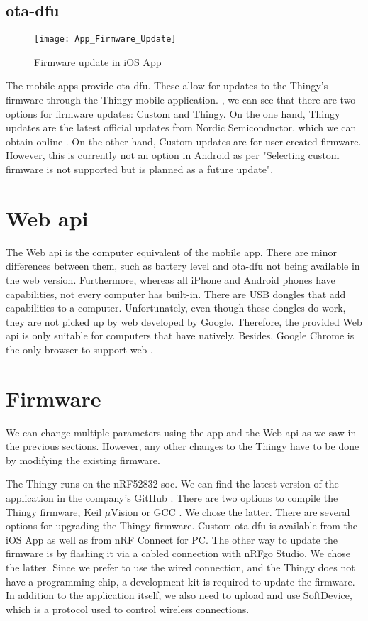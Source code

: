 \subsection{\gls{ota-dfu}}
\begin{figure}[hbt!]
	\centering
	\texttt{[image: App\_Firmware\_Update]}
	\caption{Firmware update in iOS App}
	\label{fig:app_firmware}
\end{figure}
The mobile apps provide \gls{ota-dfu}. These allow for updates to the Thingy's firmware through the Thingy mobile application. , we can see that there are two options for firmware updates: Custom and Thingy. On the one hand, Thingy updates are the latest official updates from Nordic Semiconductor, which we can obtain online \cite{FirmwareDownload}. On the other hand, Custom updates are for user-created firmware. However, this is currently not an option in Android as per \cite{DocFeatures} "Selecting custom firmware is not supported but is planned as a future update".

\section{Web \bt \gls{api}}
The Web \bt \gls{api} \cite{WebAPI} is the computer equivalent of the mobile app. There are minor differences between them, such as battery level and \gls{ota-dfu} not being available in the web version. Furthermore, whereas all iPhone and Android phones have \bt capabilities, not every computer has \bt built-in. There are USB dongles that add \bt capabilities to a computer. Unfortunately, even though these dongles do work, they are not picked up by web \bt developed by Google. Therefore, the provided Web \bt \gls{api} is only suitable for computers that have \bt natively. Besides, Google Chrome is the only browser to support web \bt \cite{WebBluetooth}.

\section{Firmware}
We can change multiple parameters using the app and the Web \bt \gls{api} as we saw in the previous sections. However, any other changes to the Thingy have to be done by modifying the existing firmware.

The Thingy runs on the nRF52832 \gls{soc}. We can find the latest version of the application in the company's GitHub \cite{FirmwareGH}. There are two options to compile the Thingy firmware, Keil $\mu${Vision} or GCC \cite{compilefirmware}. We chose the latter. There are several options for upgrading the Thingy firmware. Custom \gls{ota-dfu} is available from the iOS App as well as from nRF Connect for PC. The other way to update the firmware is by flashing it via a cabled connection with nRFgo Studio. We chose the latter. Since we prefer to use the wired connection, and the Thingy does not have a programming chip, a development kit is required to update the firmware. In addition to the application itself, we also need to upload and use SoftDevice, which is a protocol used to control wireless connections.

